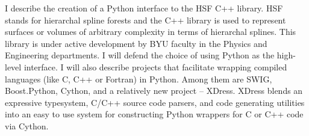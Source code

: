 I describe the creation of a Python interface to the HSF C++ library. HSF stands for hierarchal spline forests and the C++ library is used to represent surfaces or volumes of arbitrary complexity in terms of hierarchal splines. This library is under active development by BYU faculty in the Physics and Engineering departments. I will defend the choice of using Python as the high-level interface. I will also describe projects that facilitate wrapping compiled languages (like C, C++ or Fortran) in Python. Among them are SWIG, Boost.Python, Cython, and a relatively new project -- XDress. XDress blends an expressive typesystem, C/C++ source code parsers, and code generating utilities into an easy to use system for constructing Python wrappers for C or C++ code via Cython.
